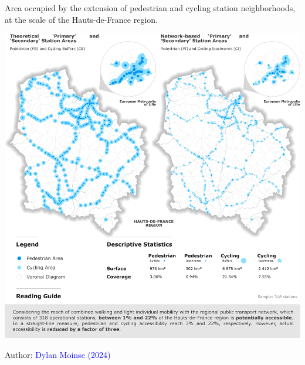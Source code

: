 \begin{refsegment}
    \begin{carte}[h!]\vspace*{4pt}
        \caption{Area occupied by the extension of pedestrian and cycling station neighborhoods, at the scale of the Hauts-de-France region.}
        \label{fig-chap5:aires-influence}
        \centerline{\includegraphics[width=1\columnwidth]{src/Figures/Chap-5/EN_Distances_Aires_influence.png}}
        \vspace{5pt}
        \begin{flushright}\scriptsize{
        Author: \textcolor{blue}{Dylan Moinse (2024)}
        }\end{flushright}
    \end{carte}


\end{refsegment}
